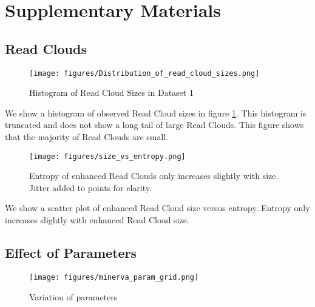 \newpage

\section{Supplementary Materials}

\subsection{Read Clouds}

\begin{figure}%
  \begin{center}
    \texttt{[image: figures/Distribution\_of\_read\_cloud\_sizes.png]}
	\caption{\small{Histogram of Read Cloud Sizes in Dataset 1}}
    \label{fig:histo}
  \end{center}
\end{figure}

We show a histogram of observed Read Cloud sizes in figure \ref{fig:histo}. This histogram is truncated and does not show a long tail of large Read Clouds. This figure shows that the majority of Read Clouds are small.

\begin{figure}%
  \begin{center}
    \texttt{[image: figures/size\_vs\_entropy.png]}
	\caption{\small{Entropy of enhanced Read Clouds only increases slightly with size. Jitter added to points for clarity.}}
    \label{fig:size_entropy}
  \end{center}
\end{figure}

We show a scatter plot of enhanced Read Cloud size versus entropy. Entropy only increases slightly with enhanced Read Cloud size.

\subsection{Effect of Parameters}

\begin{figure}%
  \begin{center}
    \texttt{[image: figures/minerva\_param\_grid.png]}
	\caption{\small{Variation of parameters}}
    \label{fig:params}
  \end{center}
\end{figure}


